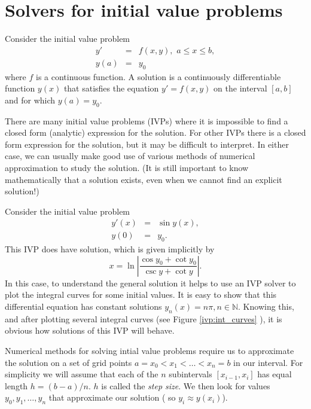 \label{lab:IVP}


\section{Solvers for initial value problems}

Consider the initial value problem 
\begin{eqnarray*}
y' &=& f(x,y),\,\, a \leq x \leq b, \\
y(a) &=& y_0
\end{eqnarray*}
where $f$ is a continuous function. A solution is a continuously differentiable function $y(x)$ that satisfies the equation $y' = f(x,y)$ on the interval $[a,b]$ and for which $y(a) = y_0$.  


There are many initial value problems (IVPs) where it is impossible to find a closed form (analytic) expression for the solution. 
For other IVPs there is a closed form expression for the solution, but it may be difficult to interpret. 
In either case, we can usually make good use of various methods of numerical approximation to study the solution. (It is still important to know mathematically that a solution exists, even when we cannot find an explicit solution!)


Consider the initial value problem 
\begin{eqnarray*}
y'(x) &=& \sin y(x), \\
y(0) &=& y_0.
\end{eqnarray*}
This IVP does have solution, which is given implicitly by 
\[x = \ln \left|\frac{\cos y_0 + \cot y_0}{\csc y + \cot y} \right|.\]
In this case, to understand the general solution it helps to use an IVP solver to plot the integral curves for some initial values. It is easy to show that this differential equation has constant solutions $y_n(x) = n \pi, n \in \mathbb{N}$. Knowing this, and after plotting several integral curves (see Figure \ref{ivp:int_curves} ), it is obvious how solutions of this IVP will behave.


Numerical methods for solving intial value problems require us to approximate the solution on a set of grid points $a = x_0< x_1<\hdots< x_n = b$ in our interval.  For simplicity we will assume that each of the $n$ subintervals $[x_{i-1},x_i]$ has equal length $h = (b-a)/n$. $h$ is called the \textit{step size}. We then look for values $y_0,y_1, \hdots, y_n$ that approximate our solution ( so $y_i \approx y(x_i)$).  

